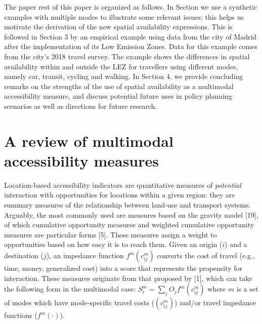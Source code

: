 \documentclass[10pt,letterpaper]{article}
\begin{document}
The paper rest of this paper is organized as follows. In Section we use
a synthetic examples with multiple modes to illustrate some relevant
issues; this helps us motivate the derivation of the new spatial
availability expressions. This is followed in Section 3 by an empirical
example using data from the city of Madrid after the implementation of
its Low Emission Zones. Data for this example comes from the city's 2018
travel survey. The example shows the differences in spatial availability
within and outside the LEZ for travellers using different modes, namely
car, transit, cycling and walking. In Section 4, we provide concluding
remarks on the strengths of the use of spatial availability as a
multimodal accessibility measure, and discuss potential future uses in
policy planning scenarios as well as directions for future research.

\hypertarget{a-review-of-multimodal-accessibility-measures}{%
\section{A review of multimodal accessibility
measures}\label{a-review-of-multimodal-accessibility-measures}}

Location-based accessibility indicators are quantitative measures of
\emph{potential} interaction with opportunities for locations within a
given region: they are summary measures of the relationship between
land-use and transport systems. Arguably, the most commonly used are
measures based on the gravity model {[}19{]}, of which cumulative
opportunity measures and weighted cumulative opportunity measures are
particular forms {[}5{]}. These measures assign a weight to
opportunities based on how easy it is to reach them. Given an origin
(\(i\)) and a destination (\(j\)), an impedance function
\(f^{m}(c^m_{ij})\) converts the cost of travel (e.g., time, money,
generalized cost) into a score that represents the propensity for
interaction. These measures originate from that proposed by {[}1{]},
which can take the following form in the multimodal case:
\(S_i^m = \sum_j O_j f^m(c_{ij}^m)\) where \(m\) is a set of modes which
have mode-specific travel costs (\((c_{ij}^m)\)) and/or travel impedance
functions (\(f^m(\cdot)\)).
\end{document}
